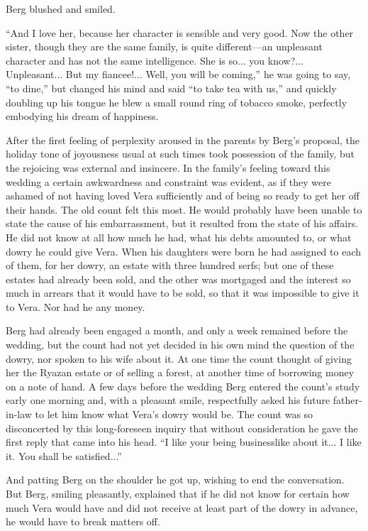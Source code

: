 Berg blushed and smiled.

``And I love her, because her character is sensible and very
good. Now the other sister, though they are the same family, is
quite different---an unpleasant character and has not the same
intelligence. She is so...  you know?... Unpleasant... But my
fiancee!... Well, you will be coming,'' he was going to say, ``to
dine,'' but changed his mind and said ``to take tea with us,''
and quickly doubling up his tongue he blew a small round ring of
tobacco smoke, perfectly embodying his dream of happiness.

After the first feeling of perplexity aroused in the parents by
Berg's proposal, the holiday tone of joyousness usual at such
times took possession of the family, but the rejoicing was
external and insincere.  In the family's feeling toward this
wedding a certain awkwardness and constraint was evident, as if
they were ashamed of not having loved Vera sufficiently and of
being so ready to get her off their hands. The old count felt
this most. He would probably have been unable to state the cause
of his embarrassment, but it resulted from the state of his
affairs. He did not know at all how much he had, what his debts
amounted to, or what dowry he could give Vera. When his daughters
were born he had assigned to each of them, for her dowry, an
estate with three hundred serfs; but one of these estates had
already been sold, and the other was mortgaged and the interest
so much in arrears that it would have to be sold, so that it was
impossible to give it to Vera. Nor had he any money.

Berg had already been engaged a month, and only a week remained
before the wedding, but the count had not yet decided in his own
mind the question of the dowry, nor spoken to his wife about
it. At one time the count thought of giving her the Ryazan estate
or of selling a forest, at another time of borrowing money on a
note of hand. A few days before the wedding Berg entered the
count's study early one morning and, with a pleasant smile,
respectfully asked his future father-in-law to let him know what
Vera's dowry would be. The count was so disconcerted by this
long-foreseen inquiry that without consideration he gave the
first reply that came into his head. ``I like your being
businesslike about it... I like it. You shall be satisfied...''

And patting Berg on the shoulder he got up, wishing to end the
conversation. But Berg, smiling pleasantly, explained that if he
did not know for certain how much Vera would have and did not
receive at least part of the dowry in advance, he would have to
break matters off.

